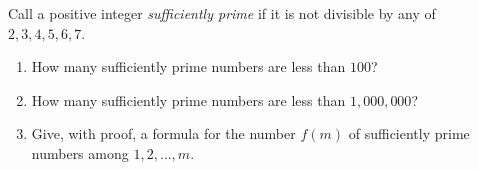 Call a positive integer \emph{sufficiently prime} if it is not divisible by any of \(2,3,4,5,6,7\).
\begin{enumerate}
\item[(a)] How many sufficiently prime numbers are less than \(100\)?
\item[(b)] How many sufficiently prime numbers are less than \(1{,}000{,}000\)?
\item[(c)] Give, with proof, a formula for the number \(f(m)\) of sufficiently prime numbers among \(1,2,\dots,m\).
\end{enumerate}
